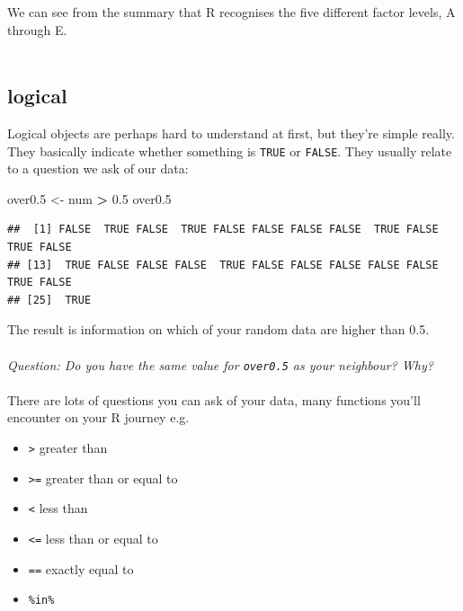 \documentclass[
]{book}
\newenvironment{Shaded}{\begin{snugshade}}{\end{snugshade}}
\newcommand{\FloatTok}[1]{\textcolor[rgb]{0.00,0.00,0.81}{#1}}
\newcommand{\NormalTok}[1]{#1}
\newcommand{\OperatorTok}[1]{\textcolor[rgb]{0.81,0.36,0.00}{\textbf{#1}}}
\newcommand{\StringTok}[1]{\textcolor[rgb]{0.31,0.60,0.02}{#1}}
\providecommand{\tightlist}{%
  \setlength{\itemsep}{0pt}\setlength{\parskip}{0pt}}
\begin{document}
We can see from the summary that R recognises the five different factor levels,
A through E.\\
~\\

\hypertarget{logical}{%
\subsection{logical}\label{logical}}

Logical objects are perhaps hard to understand at first, but they're simple
really. They basically indicate whether something is \texttt{TRUE} or \texttt{FALSE}. They
usually relate to a question we ask of our data:

\begin{Shaded}
\begin{Highlighting}[]
\NormalTok{over0}\FloatTok{.5}\NormalTok{ <-}\StringTok{ }\NormalTok{num }\OperatorTok{>}\StringTok{ }\FloatTok{0.5}
\NormalTok{over0}\FloatTok{.5}
\end{Highlighting}
\end{Shaded}

\begin{verbatim}
##  [1] FALSE  TRUE FALSE  TRUE FALSE FALSE FALSE FALSE  TRUE FALSE  TRUE FALSE
## [13]  TRUE FALSE FALSE FALSE  TRUE FALSE FALSE FALSE FALSE FALSE  TRUE FALSE
## [25]  TRUE
\end{verbatim}

The result is information on which of your random data are higher than 0.5.\\
~\\

\emph{Question: Do you have the same value for \texttt{over0.5} as your neighbour? Why?}\\
~\\

There are lots of questions you can ask of your data, many functions you'll
encounter on your R journey e.g.~

\begin{itemize}
\tightlist
\item
  \texttt{\textgreater{}} greater than
\item
  \texttt{\textgreater{}=} greater than or equal to
\item
  \texttt{\textless{}} less than
\item
  \texttt{\textless{}=} less than or equal to
\item
  \texttt{==} exactly equal to
\item
  \texttt{\%in\%}~\\
\end{itemize}
\end{document}
